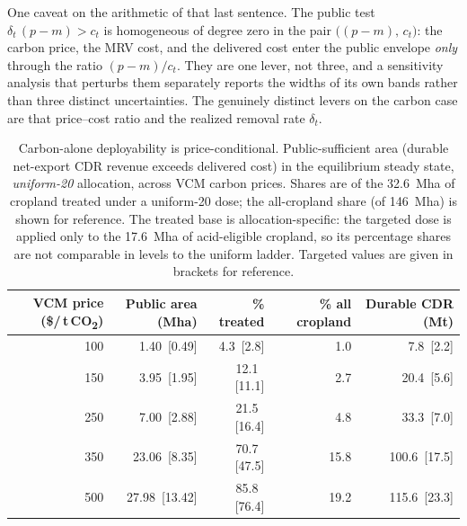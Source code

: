 \documentclass[12pt]{article}
\newcommand{\tco}{\,t\,CO\textsubscript{2}}
\begin{document}
One caveat on the arithmetic of that last sentence. The public test
$\delta_t\,(p-m) > c_t$ is homogeneous of degree zero in the pair
$\bigl((p-m),\,c_t\bigr)$: the carbon price, the MRV cost, and the delivered cost
enter the public envelope \emph{only} through the ratio $(p-m)/c_t$. They are one
lever, not three, and a sensitivity analysis that perturbs them separately reports
the widths of its own bands rather than three distinct uncertainties. The genuinely
distinct levers on the carbon case are that price--cost ratio and the realized
removal rate $\delta_t$.

\begin{table}[t]
\centering
\caption{Carbon-alone deployability is price-conditional. Public-sufficient area
(durable net-export CDR revenue exceeds delivered cost) in the equilibrium steady
state, \emph{uniform-20} allocation, across VCM carbon prices. Shares are of the
32.6~Mha of cropland treated under a uniform-20 dose; the all-cropland share (of
146~Mha) is shown for reference. The treated base is allocation-specific: the
targeted dose is applied only to the 17.6~Mha of acid-eligible cropland, so its
percentage shares are not comparable in levels to the uniform ladder. Targeted
values are given in brackets for reference.}
\label{tab:priceladder}
\small
\begin{tabular}{rrrrr}
\toprule
VCM price (\$/\tco{}) & Public area (Mha) & \% treated & \% all cropland & Durable CDR (Mt) \\
\midrule
100 &  1.40 \,[0.49] &  4.3 \,[2.8] &  1.0 & \phantom{0}7.8 \,[\phantom{0}2.2] \\
150 &  3.95 \,[1.95] & 12.1 \,[11.1] &  2.7 & 20.4 \,[\phantom{0}5.6] \\
250 &  7.00 \,[2.88] & 21.5 \,[16.4] &  4.8 & 33.3 \,[\phantom{0}7.0] \\
350 & 23.06 \,[8.35] & 70.7 \,[47.5] & 15.8 & 100.6 \,[17.5] \\
500 & 27.98 \,[13.42] & 85.8 \,[76.4] & 19.2 & 115.6 \,[23.3] \\
\bottomrule
\end{tabular}
\end{table}
\end{document}
